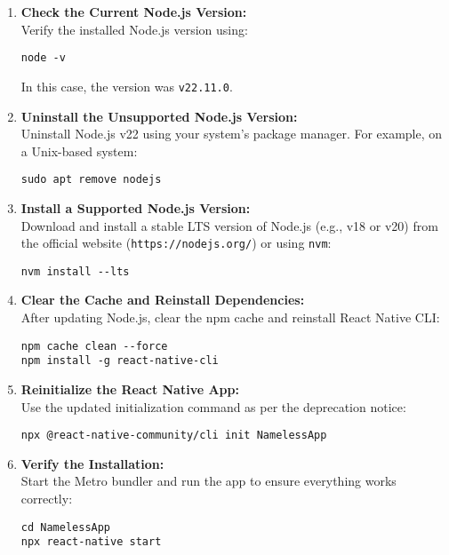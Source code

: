 \documentclass{article}
\begin{document}
\begin{enumerate}
    \item \textbf{Check the Current Node.js Version:} \\
          Verify the installed Node.js version using:
          \begin{lstlisting}
node -v
          \end{lstlisting}
          In this case, the version was \texttt{v22.11.0}.
          
    \item \textbf{Uninstall the Unsupported Node.js Version:} \\
          Uninstall Node.js v22 using your system's package manager. For example, on a Unix-based system:
          \begin{lstlisting}
sudo apt remove nodejs
          \end{lstlisting}
          
    \item \textbf{Install a Supported Node.js Version:} \\
          Download and install a stable LTS version of Node.js (e.g., v18 or v20) from the official website (\texttt{https://nodejs.org/}) or using \texttt{nvm}:
          \begin{lstlisting}
nvm install --lts
          \end{lstlisting}
          
    \item \textbf{Clear the Cache and Reinstall Dependencies:} \\
          After updating Node.js, clear the npm cache and reinstall React Native CLI:
          \begin{lstlisting}
npm cache clean --force
npm install -g react-native-cli
          \end{lstlisting}
          
    \item \textbf{Reinitialize the React Native App:} \\
          Use the updated initialization command as per the deprecation notice:
          \begin{lstlisting}
npx @react-native-community/cli init NamelessApp
          \end{lstlisting}
          
    \item \textbf{Verify the Installation:} \\
          Start the Metro bundler and run the app to ensure everything works correctly:
          \begin{lstlisting}
cd NamelessApp
npx react-native start
          \end{lstlisting}
\end{enumerate}
\end{document}
